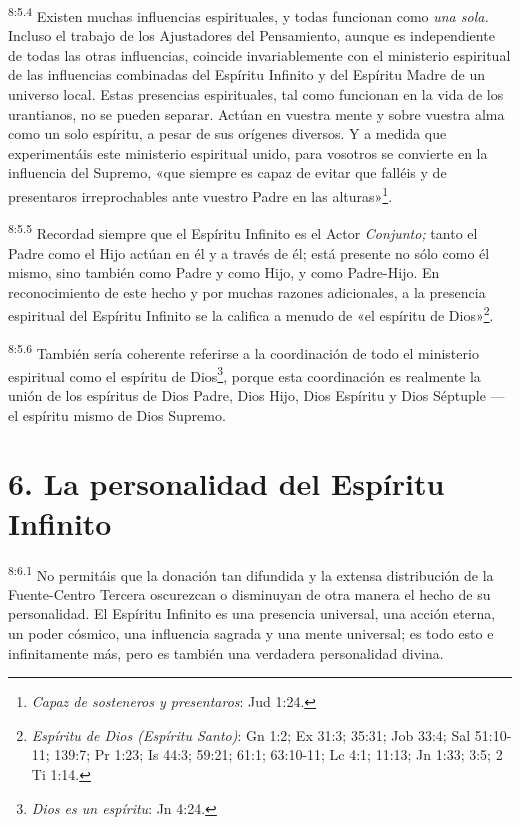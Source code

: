 \par
\textsuperscript{8:5.4} Existen muchas influencias espirituales, y todas funcionan como \textit{una sola.} Incluso el trabajo de los Ajustadores del Pensamiento, aunque es independiente de todas las otras influencias, coincide invariablemente con el ministerio espiritual de las influencias combinadas del Espíritu Infinito y del Espíritu Madre de un universo local. Estas presencias espirituales, tal como funcionan en la vida de los urantianos, no se pueden separar. Actúan en vuestra mente y sobre vuestra alma como un solo espíritu, a pesar de sus orígenes diversos. Y a medida que experimentáis este ministerio espiritual unido, para vosotros se convierte en la influencia del Supremo, «que siempre es capaz de evitar que falléis y de presentaros irreprochables ante vuestro Padre en las alturas»\footnote{\textit{Capaz de sosteneros y presentaros}: Jud 1:24.}.

\par
\textsuperscript{8:5.5} Recordad siempre que el Espíritu Infinito es el Actor \textit{Conjunto;} tanto el Padre como el Hijo actúan en él y a través de él; está presente no sólo como él mismo, sino también como Padre y como Hijo, y como Padre-Hijo. En reconocimiento de este hecho y por muchas razones adicionales, a la presencia espiritual del Espíritu Infinito se la califica a menudo de «el espíritu de Dios»\footnote{\textit{Espíritu de Dios (Espíritu Santo)}: Gn 1:2; Ex 31:3; 35:31; Job 33:4; Sal 51:10-11; 139:7; Pr 1:23; Is 44:3; 59:21; 61:1; 63:10-11; Lc 4:1; 11:13; Jn 1:33; 3:5; 2 Ti 1:14.}.

\par
\textsuperscript{8:5.6} También sería coherente referirse a la coordinación de todo el ministerio espiritual como el espíritu de Dios\footnote{\textit{Dios es un espíritu}: Jn 4:24.}, porque esta coordinación es realmente la unión de los espíritus de Dios Padre, Dios Hijo, Dios Espíritu y Dios Séptuple ---el espíritu mismo de Dios Supremo.

\section*{6. La personalidad del Espíritu Infinito}
\par
\textsuperscript{8:6.1} No permitáis que la donación tan difundida y la extensa distribución de la Fuente-Centro Tercera oscurezcan o disminuyan de otra manera el hecho de su personalidad. El Espíritu Infinito es una presencia universal, una acción eterna, un poder cósmico, una influencia sagrada y una mente universal; es todo esto e infinitamente más, pero es también una verdadera personalidad divina.


